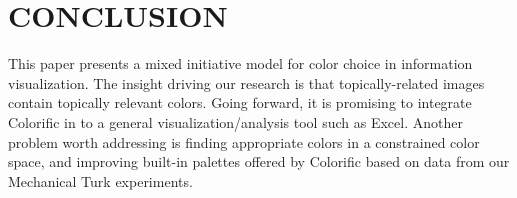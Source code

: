 \documentclass{chi2011}
\newcommand{\system}{Colorific\xspace}
\begin{document}
\section{CONCLUSION}
This paper presents a mixed initiative model for color choice in information visualization. The insight driving our research is that topically-related images contain topically relevant colors. 
Going forward, it is promising to integrate \system in to a general visualization/analysis tool such as Excel. Another problem worth addressing is finding appropriate colors in a constrained color space, and improving built-in palettes offered by \system based on data from our Mechanical Turk experiments. 




\end{document}
